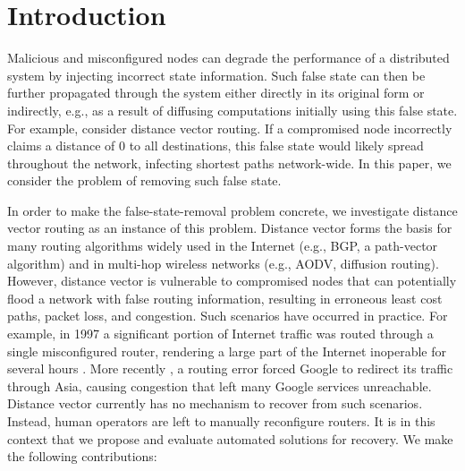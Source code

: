 \section{Introduction}
\label{subsec:rb-intro}


Malicious and misconfigured nodes can degrade the performance of a distributed system by injecting incorrect state information. Such false state can then be further propagated 
through the system either directly in its original form or indirectly, e.g., as a result of diffusing computations initially using this false state. 
For example, consider distance vector routing.  If a compromised node incorrectly claims a distance of $0$ to all destinations, this false state would likely
spread throughout the network, infecting shortest paths network-wide.
In this paper, we consider the problem of removing such false state. %

In order to make the false-state-removal problem concrete, we investigate distance vector routing as an instance of this problem. Distance vector forms the basis for many routing 
algorithms widely used in the Internet (e.g., BGP, a path-vector algorithm) and in multi-hop wireless networks (e.g., AODV, diffusion routing). However, distance vector is vulnerable 
to compromised nodes that can potentially flood a network with false routing information, resulting in erroneous least cost paths, packet loss, and congestion. Such scenarios have occurred
in practice. For example, in 1997 a significant portion of Internet traffic was routed through a single misconfigured router, rendering a large part of the Internet inoperable for several
hours \cite{Neumann97}. More recently \cite{Google}, a routing error forced Google to redirect its traffic through Asia, causing congestion that left many Google services unreachable. 
Distance vector currently has no mechanism to recover from such scenarios. Instead, human operators are left to manually reconfigure routers. It is in this context that we propose and
evaluate automated solutions for recovery.  We make the following contributions:

